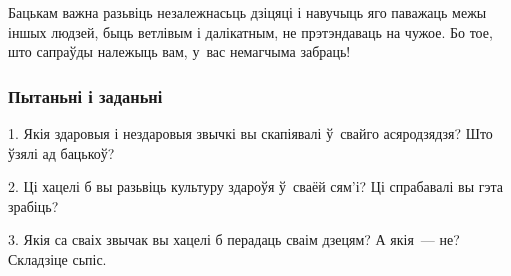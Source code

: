 Бацькам важна разьвіць незалежнасьць дзіцяці і навучыць яго паважаць межы іншых людзей, быць ветлівым і далікатным, не прэтэндаваць на чужое. Бо тое, што сапраўды належыць вам, у~вас немагчыма забраць!

\subsubsection{Пытаньні і заданьні}

1. Якія здаровыя і нездаровыя звычкі вы скапіявалі ў~свайго асяродзядзя? Што ўзялі ад бацькоў?

2. Ці хацелі б вы разьвіць культуру здароўя ў~сваёй сям'і? Ці спрабавалі вы гэта зрабіць?

3. Якія са сваіх звычак вы хацелі б перадаць сваім дзецям? А якія~--- не? Складзіце сьпіс.


